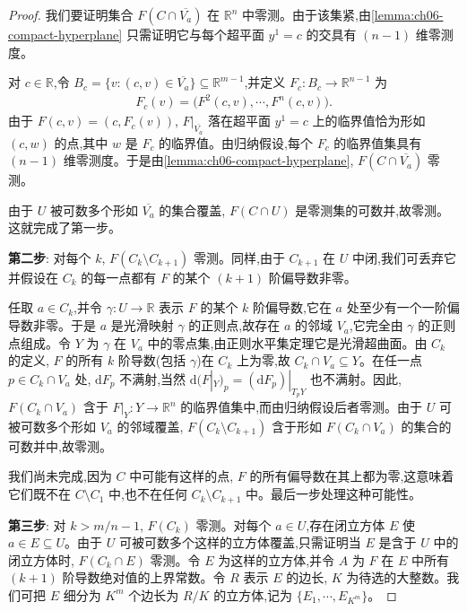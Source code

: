 \documentclass[../../main.tex]{subfiles}
\begin{document}
\begin{proof}
我们要证明集合 $F(C\cap\overline{V_a})$ 在 $\mathbb{R}^n$ 中零测。由于该集紧,由\cref{lemma:ch06-compact-hyperplane} 只需证明它与每个超平面 $y^1=c$ 的交具有 $(n-1)$ 维零测度。

对 $c\in\mathbb{R}$,令 $B_c=\{v:(c,v)\in\overline{V_a}\}\subseteq\mathbb{R}^{m-1}$,并定义 $F_c:B_c\to\mathbb{R}^{n-1}$ 为
\begin{align*}
F_c(v)=\bigl(F^2(c,v),\cdots ,F^n(c,v)\bigr).
\end{align*}
由于 $F(c,v)=(c,F_c(v))$, $F|_{\overline{V_a}}$ 落在超平面 $y^1=c$ 上的临界值恰为形如 $(c,w)$ 的点,其中 $w$ 是 $F_c$ 的临界值。由归纳假设,每个 $F_c$ 的临界值集具有 $(n-1)$ 维零测度。于是由\cref{lemma:ch06-compact-hyperplane}, $F(C\cap\overline{V_a})$ 零测。

由于 $U$ 被可数多个形如 $\overline{V_a}$ 的集合覆盖, $F(C\cap U)$ 是零测集的可数并,故零测。这就完成了第一步。

\textbf{第二步}: 对每个 $k$, $F(C_k\setminus C_{k+1})$ 零测。同样,由于 $C_{k+1}$ 在 $U$ 中闭,我们可丢弃它并假设在 $C_k$ 的每一点都有 $F$ 的某个 $(k+1)$ 阶偏导数非零。

任取 $a\in C_k$,并令 $\gamma:U\to\mathbb{R}$ 表示 $F$ 的某个 $k$ 阶偏导数,它在 $a$ 处至少有一个一阶偏导数非零。于是 $a$ 是光滑映射 $\gamma$ 的正则点,故存在 $a$ 的邻域 $V_a$,它完全由 $\gamma$ 的正则点组成。令 $Y$ 为 $\gamma$ 在 $V_a$ 中的零点集,由正则水平集定理它是光滑超曲面。由 $C_k$ 的定义, $F$ 的所有 $k$ 阶导数(包括 $\gamma$)在 $C_k$ 上为零,故 $C_k\cap V_a\subseteq Y$。在任一点 $p\in C_k\cap V_a$ 处, $\mathrm{d}F_p$ 不满射,当然 $\mathrm{d}(F|_Y)_p=(\mathrm{d}F_p)|_{T_pY}$ 也不满射。因此, $F(C_k\cap V_a)$ 含于 $F|_Y:Y\to\mathbb{R}^n$ 的临界值集中,而由归纳假设后者零测。由于 $U$ 可被可数多个形如 $V_a$ 的邻域覆盖, $F(C_k\setminus C_{k+1})$ 含于形如 $F(C_k\cap V_a)$ 的集合的可数并中,故零测。

我们尚未完成,因为 $C$ 中可能有这样的点, $F$ 的所有偏导数在其上都为零,这意味着它们既不在 $C\setminus C_1$ 中,也不在任何 $C_k\setminus C_{k+1}$ 中。最后一步处理这种可能性。

\textbf{第三步}: 对 $k>m/n-1$, $F(C_k)$ 零测。对每个 $a\in U$,存在闭立方体 $E$ 使 $a\in E\subseteq U$。由于 $U$ 可被可数多个这样的立方体覆盖,只需证明当 $E$ 是含于 $U$ 中的闭立方体时, $F(C_k\cap E)$ 零测。令 $E$ 为这样的立方体,并令 $A$ 为 $F$ 在 $E$ 中所有 $(k+1)$ 阶导数绝对值的上界常数。令 $R$ 表示 $E$ 的边长, $K$ 为待选的大整数。我们可把 $E$ 细分为 $K^m$ 个边长为 $R/K$ 的立方体,记为 $\{E_1,\cdots ,E_{K^m}\}$。


\end{proof}
\end{document}
